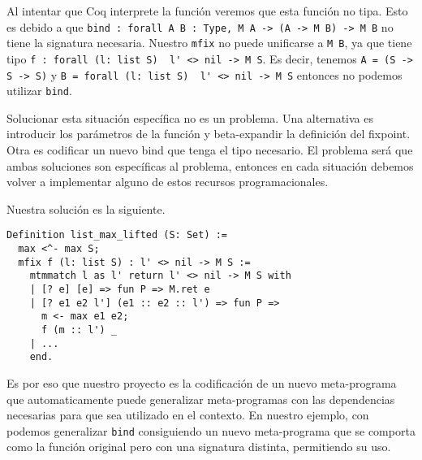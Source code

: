 Al intentar que Coq interprete la función veremos que esta función no tipa.
Esto es debido a que \lstinline{bind : forall A B : Type, M A -> (A -> M B) -> M B} no tiene la signatura necesaria.
Nuestro \lstinline{mfix} no puede unificarse a \lstinline{M B}, ya que tiene
tipo \lstinline{f : forall (l: list S)  l' <> nil -> M S}.
Es decir, tenemos \lstinline{A = (S -> S -> S)} y \lstinline{B = forall (l: list S)  l' <> nil -> M S} entonces no podemos utilizar \lstinline{bind}.

Solucionar esta situación específica no es un problema.
Una alternativa es introducir los parámetros de la función y beta-expandir la definición del fixpoint.
Otra es codificar un nuevo bind que tenga el tipo necesario.
El problema será que ambas soluciones son específicas al problema, entonces en cada situación debemos volver a implementar alguno de estos recursos programacionales.

Nuestra solución es la siguiente.

\begin{lstlisting}[float=h,frame=tb,caption={Teorema y prueba en Coq},label=lst:list_max_lifted]
Definition list_max_lifted (S: Set) :=
  max <^- max S;
  mfix f (l: list S) : l' <> nil -> M S :=
    mtmmatch l as l' return l' <> nil -> M S with
    | [? e] [e] => fun P => M.ret e
    | [? e1 e2 l'] (e1 :: e2 :: l') => fun P =>
      m <- max e1 e2;
      f (m :: l') _
    | ...
    end.
\end{lstlisting}

Es por eso que nuestro proyecto es la codificación de un nuevo meta-programa \lift que automaticamente puede generalizar meta-programas con las dependencias necesarias para que sea utilizado en el contexto.
En nuestro ejemplo, con \lift podemos generalizar \lstinline{bind} consiguiendo un nuevo meta-programa que se comporta como la función original pero con una signatura distinta, permitiendo su uso.
